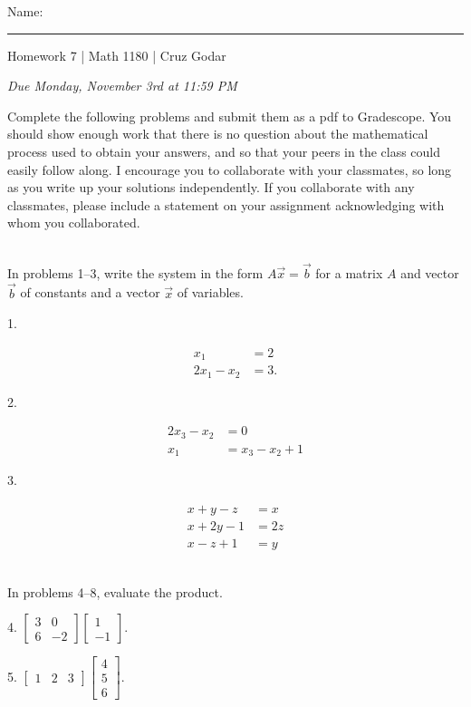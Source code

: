 \documentclass{article}
\begin{document}
\Large Name: \rule{2in}{0.15mm} \hfill Homework 7 | Math 1180 | Cruz Godar \vspace{4pt} \normalsize

\textit{Due Monday, November 3rd at 11:59 PM}

Complete the following problems and submit them as a pdf to Gradescope. You should show enough work that there is no question about the mathematical process used to obtain your answers, and so that your peers in the class could easily follow along. I encourage you to collaborate with your classmates, so long as you write up your solutions independently. If you collaborate with any classmates, please include a statement on your assignment acknowledging with whom you collaborated.

~\\

In problems 1--3, write the system in the form $A\vec{x} = \vec{b}$ for a matrix $A$ and vector $\vec{b}$ of constants and a vector $\vec{x}$ of variables.

1.

\begin{align*}
	x_1 &= 2\\
	2x_1 - x_2 &= 3.
\end{align*}

2.

\begin{align*}
	2x_3 - x_2 &= 0\\
	x_1 &= x_3 - x_2 + 1
\end{align*}

3.

\begin{align*}
	x + y - z &= x\\
	x + 2y - 1 &= 2z\\
	x - z + 1 &= y
\end{align*}

~\\

In problems 4--8, evaluate the product.

4. $\displaystyle \left[\begin{array}{cc}3& 0 \\ 6& -2\end{array}\right]\left[\begin{array}{c}1 \\ -1\end{array}\right].$

5. $\displaystyle \left[\begin{array}{ccc}1& 2& 3\end{array}\right]\left[\begin{array}{c}4 \\ 5 \\ 6\end{array}\right].$
\end{document}
